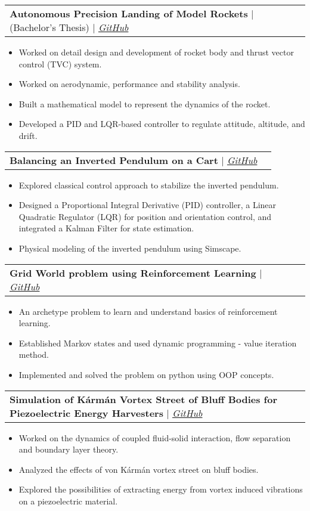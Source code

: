 \documentclass[letterpaper,11pt]{article}
\makeatletter
\newcommand{\resumeItem}[1]{
  \item\small{
    {#1 \vspace{-2pt}}
  }
}
\newcommand{\resumeProjectHeading}[2]{
    \vspace{-2pt}\item
    \begin{tabular*}{0.97\textwidth}{l@{\extracolsep{\fill}}r}
      \small#1 & #2 \\
    \end{tabular*}\vspace{-7pt}
}
\newcommand{\resumeItemListStart}{\begin{itemize}}
\newcommand{\resumeItemListEnd}{\end{itemize}\vspace{-5pt}}
\makeatother
\begin{document}
      \resumeProjectHeading
        {\textbf{Autonomous Precision Landing of Model Rockets} $|$ (Bachelor's Thesis) $|$ \emph{\href{https://github.com/raghavvs/Autonomous-Landing-of-Model-Rockets}{\color{blue}GitHub}}}{} 
          \resumeItemListStart
            \resumeItem{Worked on detail design and development of rocket body and thrust vector control (TVC) system.}
            \resumeItem{Worked on aerodynamic, performance and stability analysis.}
            \resumeItem{Built a mathematical model to represent the dynamics of the rocket.}
            \resumeItem{Developed a PID and LQR-based controller to regulate attitude, altitude, and drift.}
          \resumeItemListEnd
      
      \resumeProjectHeading
        {\textbf{Balancing an Inverted Pendulum on a Cart} $|$ \emph{\href{https://github.com/raghavvs/Inverted-Pendulum-on-a-Cart}{\color{blue}GitHub}}}{}
          \resumeItemListStart
            \resumeItem{Explored classical control approach to stabilize the inverted pendulum.}
            \resumeItem{Designed a Proportional Integral Derivative (PID) controller, a Linear Quadratic Regulator (LQR) for
						position and orientation control, and integrated a Kalman Filter for state estimation.}
			\resumeItem{Physical modeling of the inverted pendulum using Simscape.}
          \resumeItemListEnd
      
      \resumeProjectHeading
        {\textbf{Grid World problem using Reinforcement Learning} $|$ \emph{\href{https://github.com}{\color{blue}GitHub}}}{}
          \resumeItemListStart
            \resumeItem{An archetype problem to learn and understand basics of reinforcement learning.}
            \resumeItem{Established Markov states and used dynamic programming - value iteration method.}
            \resumeItem{Implemented and solved the problem on python using OOP concepts.}
          \resumeItemListEnd
      
      \resumeProjectHeading
        {\textbf{Simulation of Kármán Vortex Street of Bluff Bodies for Piezoelectric Energy Harvesters} $|$ \emph{\href{https://github.com/raghavvs/Simulation-of-Karman-Vortex-Street-of-Bluff-Bodies-for-Piezoelectric-Energy-Harvesters}{\color{blue}GitHub}}}{}
          \resumeItemListStart
            \resumeItem{Worked on the dynamics of coupled fluid-solid interaction, flow separation and boundary layer theory.}
            \resumeItem{Analyzed the effects of von Kármán vortex street on bluff bodies.}
            \resumeItem{Explored the possibilities of extracting energy from vortex induced vibrations on a piezoelectric material.}
          \resumeItemListEnd
      
\end{document}
